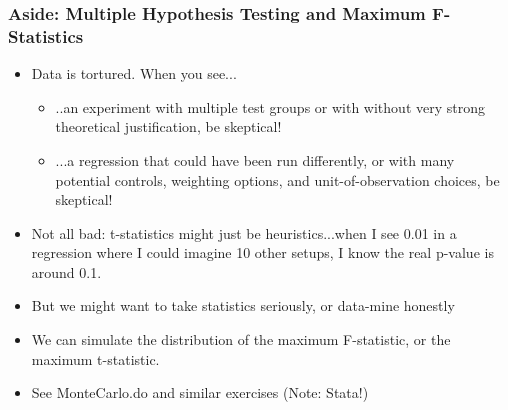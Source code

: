 \documentclass{beamer}
\begin{document}
\begin{frame}
\frametitle[alignment=center]{Aside:  Multiple Hypothesis Testing and Maximum F-Statistics}
\begin{itemize}
\item Data is tortured.  When you see...
\bigskip
\begin{itemize}
\item ..an experiment with multiple test groups or with without very strong theoretical justification, be skeptical!
\smallskip
\item ...a regression that could have been run differently, or with many potential controls, weighting options, and unit-of-observation choices, be skeptical!
\smallskip
\end{itemize}
\item Not all bad: t-statistics might just be heuristics...when I see 0.01 in a regression where I could imagine 10 other setups, I know the real p-value is around 0.1.
\bigskip
\item But we might want to take statistics seriously, or data-mine honestly
\bigskip
\item We can simulate the distribution of the maximum F-statistic, or the maximum t-statistic.
\bigskip
\item See MonteCarlo.do and similar exercises (Note: Stata!)
\end{itemize}
\end{frame}
\end{document}
